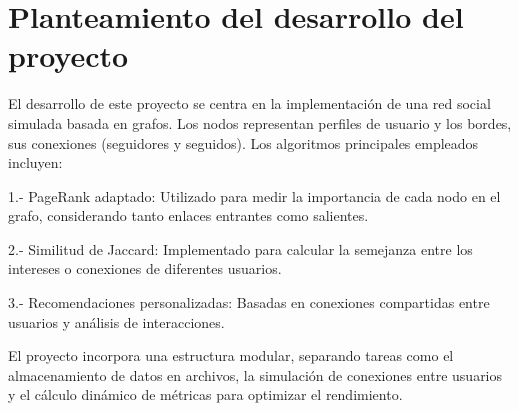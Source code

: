 \section{Planteamiento del desarrollo del proyecto}
El desarrollo de este proyecto se centra en la implementación de una red social simulada basada en grafos. Los nodos representan perfiles de usuario y los bordes, sus conexiones (seguidores y seguidos). Los algoritmos principales empleados incluyen:

	1.- PageRank adaptado: Utilizado para medir la importancia de cada nodo en el grafo, considerando tanto enlaces entrantes como salientes.

	2.- Similitud de Jaccard: Implementado para calcular la semejanza entre los intereses o conexiones de diferentes usuarios.

	3.- Recomendaciones personalizadas: Basadas en conexiones compartidas entre usuarios y 	análisis de interacciones.

El proyecto incorpora una estructura modular, separando tareas como el almacenamiento de datos en archivos, la simulación de conexiones entre usuarios y el cálculo dinámico de métricas para optimizar el rendimiento.
